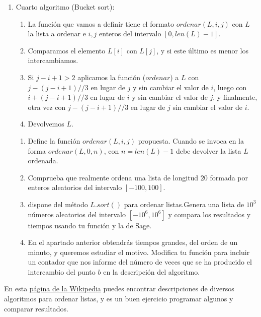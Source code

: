 \begin{enumerate}
\begin{ejer}
\begin{enumerate}
 \end{enumerate}
 \end{ejer}

\item{\sc Cuarto algoritmo (Bucket sort):} 
\begin{enumerate}
\item La función que vamos a definir tiene el formato $ordenar(L,i,j)$ con $L$ la lista a ordenar e $i,j$ enteros del intervalo $[0,len(L)-1].$
\item Comparamos el elemento $L[i]$ con $L[j]$, y si este último es menor los intercambiamos. 
\item Si $j-i+1>2$ aplicamos la función ($ordenar$) a $L$  con $j-(j-i+1)//3$ en lugar de $j$ y sin cambiar el valor de $i$, luego con $i+(j-i+1)//3$  en lugar de $i$ y sin cambiar el valor de $j$,  y finalmente, otra vez con $j-(j-i+1)//3$ en lugar de $j$ sin cambiar el valor de $i$.
 \item    Devolvemos $L$.

\end{enumerate}
\begin{ejer}
  \begin{enumerate}
  \item   Define la función $ordenar(L,i,j)$ propuesta. Cuando se invoca en la forma $ordenar(L,0,n)$, con $n=len(L)-1$ debe devolver la lista $L$ ordenada. 
    \item Comprueba que realmente ordena una lista  de longitud $20$ formada por enteros aleatorios del intervalo $[-100,100].$
    
    \item  {\sage} dispone del método $L.sort()$ para ordenar listas.Genera una lista de $10^3$ números aleatorios del intervalo $[-10^6,10^6]$ y
    compara  los resultados y tiempos usando tu función y la de Sage. 
    \item En el apartado anterior obtendrás tiempos grandes, del orden de un minuto, y queremos estudiar el motivo. Modifica tu función para incluir un contador que nos informe del número de veces que se ha producido el intercambio del punto $b$ en la descripción del algoritmo.

\end{enumerate}
\end{ejer}
\end{enumerate} 


En esta \href{https://en.wikipedia.org/wiki/Sorting_algorithm}{p\'agina de la
Wikipedia} puedes encontrar descripciones de diversos algoritmos para ordenar
listas, y {\sc es un buen ejercicio programar} algunos y comparar resultados.






